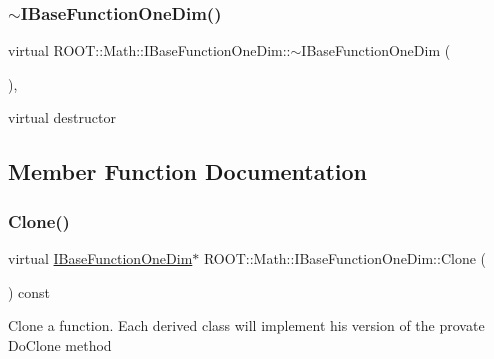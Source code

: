 \mbox{\label{classROOT_1_1Math_1_1IBaseFunctionOneDim_a475922c2b1288b843d7bc7fae17b6ae2}} 
\subsubsection{\texorpdfstring{$\sim$IBaseFunctionOneDim()}{~IBaseFunctionOneDim()}\hspace{0.1cm}{\footnotesize\ttfamily [2/2]}}
{\footnotesize\ttfamily virtual R\+O\+O\+T\+::\+Math\+::\+I\+Base\+Function\+One\+Dim\+::$\sim$\+I\+Base\+Function\+One\+Dim (\begin{DoxyParamCaption}{ }\end{DoxyParamCaption})\hspace{0.3cm}{\ttfamily [inline]}, {\ttfamily [virtual]}}

virtual destructor 

\subsection{Member Function Documentation}
\mbox{\label{classROOT_1_1Math_1_1IBaseFunctionOneDim_a656dbb4dfc43e8d1566442bfb1a717fd}} 
\subsubsection{\texorpdfstring{Clone()}{Clone()}\hspace{0.1cm}{\footnotesize\ttfamily [1/2]}}
{\footnotesize\ttfamily virtual \mbox{\hyperlink{classROOT_1_1Math_1_1IBaseFunctionOneDim}{I\+Base\+Function\+One\+Dim}}$\ast$ R\+O\+O\+T\+::\+Math\+::\+I\+Base\+Function\+One\+Dim\+::\+Clone (\begin{DoxyParamCaption}{ }\end{DoxyParamCaption}) const\hspace{0.3cm}{\ttfamily [pure virtual]}}

Clone a function. Each derived class will implement his version of the provate Do\+Clone method 

